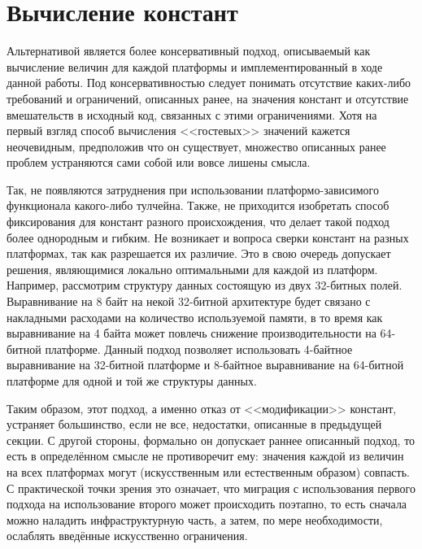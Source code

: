 \section{Вычисление констант}

Альтернативой является более консервативный подход, описываемый как вычисление величин для каждой платформы и имплементированный в ходе данной работы.
Под консервативностью следует понимать отсутствие каких-либо требований и ограничений, описанных ранее, на значения констант и отсутствие вмешательств в исходный код, связанных с этими ограничениями. Хотя на первый взгляд способ вычисления <<гостевых>> значений кажется неочевидным, предположив что он существует, множество описанных ранее проблем устраняются сами собой или вовсе лишены смысла.

\par
Так, не появляются затруднения при использовании платформо-зависимого функционала какого-либо тулчейна.
Также, не приходится изобретать способ фиксирования для констант разного происхождения, что делает такой подход более однородным и гибким.
Не возникает и вопроса сверки констант на разных платформах, так как разрешается их различие.
Это в свою очередь допускает решения, являющимися локально оптимальными для каждой из платформ.
Например, рассмотрим структуру данных состоящую из двух 32-битных полей. Выравнивание на 8 байт на некой 32-битной архитектуре будет связано с накладными расходами на количество используемой памяти, в то время как выравнивание на 4 байта может повлечь снижение производительности на 64-битной платформе.
Данный подход позволяет использовать 4-байтное выравнивание на 32-битной платформе и 8-байтное выравнивание на 64-битной платформе для одной и той же структуры данных.

\par
Таким образом, этот подход, а именно отказ от <<модификации>> констант, устраняет большинство, если не все, недостатки, описанные в предыдущей секции.
С другой стороны, формально он допускает раннее описанный подход, то есть в определённом смысле не противоречит ему: значения каждой из величин на всех платформах могут (искусственным или естественным образом) совпасть.
С практической точки зрения это означает, что миграция с использования первого подхода на использование второго может происходить поэтапно, то есть сначала можно наладить инфраструктурную часть, а затем, по мере необходимости, ослаблять введённые искусственно ограничения.

